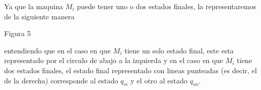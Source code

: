 \begin{frame}
  \noindent Ya que la maquina $M_{i}$ puede tener uno o dos estados finales,
  la representaremos de la siguiente manera

  \bigskip

  \bigskip

  \bigskip

  \bigskip

  Figura 5

  \bigskip

  \bigskip

  \bigskip

  \noindent entendiendo que en el caso en que $M_{i}$ tiene un solo estado
  final, este esta representado por el circulo de abajo a la izquierda y en el
  caso en que $M_{i}$ tiene dos estados finales, el estado final representado
  con lineas punteadas (es decir, el de la derecha) corresponde al estado $%
  q_{si}$ y el otro al estado $q_{no}$.

\end{frame}
